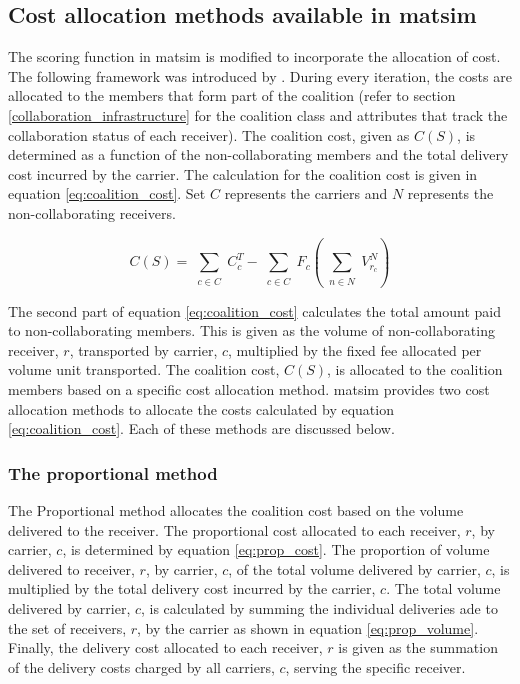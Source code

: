 \subsection{Cost allocation methods available in \acrshort{matsim}}
The scoring function in \acrshort{matsim} is modified to incorporate the allocation of cost. The following framework was introduced by \citet{bean2020behavioural}. During every iteration, the costs are allocated to the members that form part of the coalition (refer to section \ref{collaboration_infrastructure} for the coalition class and attributes that track the collaboration status of each receiver). The coalition cost, given as \(C(S)\), is determined as a function of the non-collaborating members and the total delivery cost incurred by the carrier. The calculation for the coalition cost is given in equation \ref{eq:coalition_cost}. Set \(C\) represents the carriers and \(N\) represents the non-collaborating receivers. 

\begin{equation}
\label{eq:coalition_cost}
    C(S) = \sum_{\substack{c\in C}} C_c^T - \sum_{\substack{c\in C}} F_c ( \sum_{\substack{n\in N}} V_{r_c} ^N)
\end{equation}

The second part of equation \ref{eq:coalition_cost} calculates the total amount paid to non-collaborating members. This is given as the volume of non-collaborating receiver, \(r\), transported by carrier, \(c\), multiplied by the fixed fee allocated per volume unit transported. The coalition cost, \(C(S)\), is allocated to the coalition members based on a specific cost allocation method. \acrshort{matsim} provides two cost allocation methods to allocate the costs calculated by equation \ref{eq:coalition_cost}. Each of these methods are discussed below.

\subsubsection{The proportional method}
The Proportional method allocates the coalition cost based on the volume delivered to the receiver. The proportional cost allocated to each receiver, \(r\), by carrier, \(c\), is determined by equation \ref{eq:prop_cost}. The proportion of volume delivered to receiver, \(r\), by carrier, \(c\), of the total volume delivered by carrier, \(c\), is multiplied by the total delivery cost incurred by the carrier, \(c\). The total volume delivered by carrier, \(c\), is calculated by summing the individual deliveries ade to the set of receivers, \(r\), by the carrier as shown in equation \ref{eq:prop_volume}. Finally, the delivery cost allocated to each receiver, \(r\) is given as the summation of the delivery costs charged by all carriers, \(c\), serving the specific receiver. 

